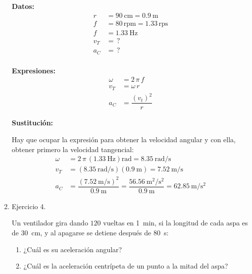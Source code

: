 \documentclass[12pt]{article}
\begin{document}
\begin{enumerate}
\vspace*{0.5cm}
\begin{minipage}[t]{0.4\linewidth}
\textbf{Datos:}
\begin{align*}
r &= \SI{90}{\centi\meter} = \SI{0.9}{\meter} \\
f &= 80 \, \text{rpm} = 1.33 \, \text{rps} \\
f &= \SI{1.33}{\hertz} \\
v_{T} &= \, ? \\
a_{C} &= \, ? \\
\end{align*}
\end{minipage}
\begin{minipage}[t]{0.4\linewidth}
\textbf{Expresiones:}
\begin{align*}
\omega &= 2 \, \pi \, f \\
v_{T} &= \omega \, r \\
a_{C} &= \dfrac{(v_{t})^{2}}{r}
\end{align*}
\end{minipage}

\textbf{Sustitución:}

Hay que ocupar la expresión para obtener la velocidad angular y con ella, obtener primero la velocidad tangencial:
\begin{align*}
    \omega &= 2 \, \pi \, \left( \SI{1.33}{\hertz} \right) \unit{\radian} = \SI[per-mode=fraction]{8.35}{\radian\per\second} \\[0.5em]
    v_{T} &= \left( \SI[per-mode=fraction]{8.35}{\radian\per\second} \right) (\SI{0.9}{\meter}) = \SI[per-mode=fraction]{7.52}{\meter\per\second} \\[0.5em]
    a_{C} &= \dfrac{\displaystyle \left( \SI[per-mode=fraction]{7.52}{\meter\per\second} \right)^{2}}{\SI{0.9}{\meter}} = \dfrac{\displaystyle \SI[per-mode=fraction]{56.56}{\square\meter\per\square\second}}{\SI{0.9}{\meter}} = \SI[per-mode=fraction]{62.85}{\meter\per\square\second}
    \end{align*}

\item Ejercicio 4.

Un ventilador gira dando $120$ vueltas en \SI{1}{\minute}, si la longitud de cada aspa es de \SI{30}{\centi\meter}, y al apagarse se detiene después de \SI{80}{\second}:
\begin{enumerate}[label=\roman*)]
\item ¿Cuál es su aceleración angular?
\item ¿Cuál es la aceleración centrípeta de un punto a la mitad del aspa?
\end{enumerate}



\end{enumerate}
\end{document}
